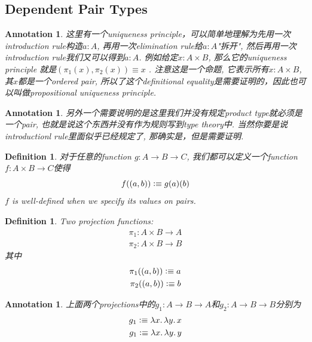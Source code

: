 \documentclass{article}
\newtheorem{definition}[theorem]{Definition}
\newtheorem{annotation}[theorem]{Annotation}
\newcommand{\lam}[2]{\ensuremath{\lambda #1\ldotp #2}} %
\newcommand{\defeqv}{\vcentcolon\equiv}
\begin{document}
\subsection{Dependent Pair Types}

\begin{annotation}
\rm 这里有一个uniqueness principle，可以简单地理解为先用一次introduction rule构造$a : A$, 再用一次elimination rule给$a : A$"拆开", 然后再用一次introduction rule我们又可以得到$a : A$. 例如给定$x : A \times B$, 那么它的uniqueness principle 就是$(\pi_1(x), \pi_2(x)) \equiv x$ . 注意这是一个命题, 它表示所有$x : A \times B$, 其$x$都是一个ordered pair, 所以了这个definitional equality是需要证明的，因此也可以叫做propositional uniqueness principle. 
\end{annotation}

\begin{annotation}
\rm 另外一个需要说明的是这里我们并没有规定product type就必须是一个pair, 也就是说这个东西并没有作为规则写到type theory中. 当然你要是说introductionl rule里面似乎已经规定了, 那确实是，但是需要证明.
\end{annotation}

\begin{definition}
\rm 对于任意的function $g: A \to B \to C$, 我们都可以定义一个function $f: A \times B \to C$使得
\[
	f((a,b)) \defeqv g(a)(b)
\]
$f$ is well-defined when we specify its values on pairs.
\end{definition}

\begin{definition}
\rm Two projection functions:
\[
	\begin{aligned}
	\pi_1: A \times B \to A \\
	\pi_2: A \times B \to B
	\end{aligned}
\]
其中
\[
	\begin{aligned}
	\pi_1((a,b)) \defeqv a \\
	\pi_2((a,b)) \defeqv b 
	\end{aligned}
\]
\end{definition}

\begin{annotation}
上面两个projections中的$g_1 : A \to B \to A$和$g_2: A \to B \to B$分别为
\[
    \begin{aligned}
    g_1 \defeqv \lam{x}{\lam{y}{x}} \\
    g_1 \defeqv \lam{x}{\lam{y}{y}}
    \end{aligned}
\]
\end{annotation}
\end{document}
